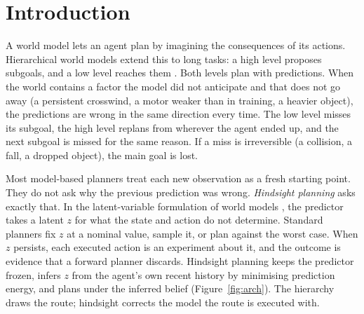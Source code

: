 \documentclass[11pt]{article}
\begin{document}
\section{Introduction}

A world model lets an agent plan by imagining the consequences of its actions. Hierarchical world models extend
this to long tasks: a high level proposes subgoals, and a low level reaches them
\citep{lecun2022path,hjepa_2610_06805}. Both levels plan with predictions. When the world contains a factor the model
did not anticipate and that does not go away (a persistent crosswind, a motor weaker than in training, a heavier
object), the predictions are wrong in the same direction every time. The low level misses its subgoal, the high level
replans from wherever the agent ended up, and the next subgoal is missed for the same reason. If a miss is
irreversible (a collision, a fall, a dropped object), the main goal is lost.

Most model-based planners treat each new observation as a fresh starting point. They do not ask why the previous
prediction was wrong. \emph{Hindsight planning} asks exactly that. In the latent-variable formulation of world models
\citep{lecun2022path}, the predictor takes a latent $z$ for what the state and action do not determine. Standard planners
fix $z$ at a nominal value, sample it, or plan against the worst case. When $z$ persists, each executed action is an
experiment about it, and the outcome is evidence that a forward planner discards. Hindsight planning keeps the
predictor frozen, infers $z$ from the agent's own recent history by minimising prediction energy, and plans under the
inferred belief (Figure~\ref{fig:arch}). The hierarchy draws the route; hindsight corrects the model the route is
executed with.
\end{document}
